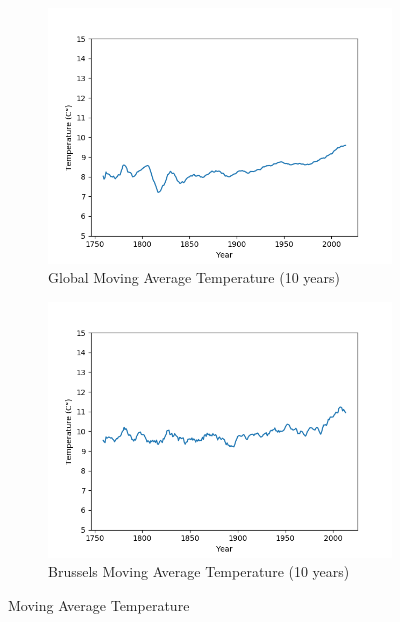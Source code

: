 \documentclass{article}
\begin{document}
\begin{figure}[H]
\centering
\begin{subfigure}[h]{0.8\linewidth}
\includegraphics[width=\linewidth]{GlobalAverageTemperatureMoving.png}
\caption{Global Moving Average Temperature (10 years)}
\end{subfigure}
\begin{subfigure}[h]{0.8\linewidth}
\includegraphics[width=\linewidth]{BrusselsAverageTemperatureMoving.png}
\caption{Brussels Moving Average Temperature (10 years)}
\end{subfigure}
\caption{Moving Average Temperature}
\label{fig:movingaveragetemp}
\end{figure}
\end{document}
